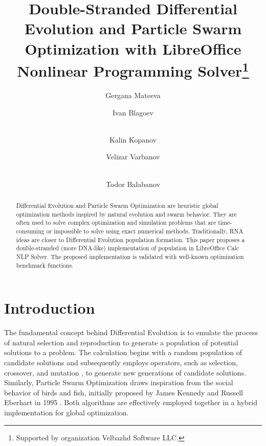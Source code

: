 \documentclass[runningheads]{llncs}
\begin{document}
\title{Double-Stranded Differential Evolution and Particle Swarm Optimization with LibreOffice Nonlinear Programming Solver\thanks{Supported by organization Velbazhd Software LLC.}}


\author{
Gergana Mateeva \and
Ivan Blagoev \and\\
Kalin Kopanov \and
Velizar Varbanov \and\\
Todor Balabanov
}



\maketitle

\begin{abstract}
Differential Evolution and Particle Swarm Optimization are heuristic global optimization methods inspired by natural evolution and swarm behavior. They are often used to solve complex optimization and simulation problems that are time-consuming or impossible to solve using exact numerical methods. Traditionally, RNA ideas are closer to Differential Evolution population formation. This paper proposes a double-stranded (more DNA-like) implementation of population in LibreOffice Calc NLP Solver. The proposed implementation is validated with well-known optimization benchmark functions.

\end{abstract}

\section{Introduction}

The fundamental concept behind Differential Evolution is to emulate the process of natural selection and reproduction to generate a population of potential solutions to a problem. The calculation begins with a random population of candidate solutions and subsequently employs operators, such as selection, crossover, and mutation \cite{Lambora-2019}, to generate new generations of candidate solutions. Similarly, Particle Swarm Optimization draws inspiration from the social behavior of birds and fish, initially proposed by James Kennedy and Russell Eberhart in 1995 \cite{Kennedy-1995}. Both algorithms are effectively employed together in a hybrid implementation for global optimization.
\end{document}
